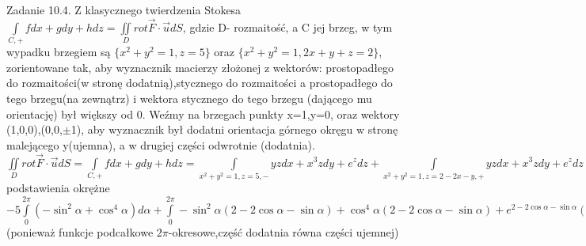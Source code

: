 \documentclass{article}
\begin{document}
Zadanie 10.4.
\newline
\newline
Z klasycznego twierdzenia Stokesa $\int\limits_{C,+}fdx+gdy+hdz=\iint\limits_{D}rot\overrightarrow{F}\cdot\overrightarrow{u}dS$, gdzie D- rozmaitość, a C jej brzeg,
w tym wypadku brzegiem są $\{x^2+y^2=1,z=5\}$ oraz $\{x^2+y^2=1,2x+y+z=2\}$, zorientowane tak, aby wyznacznik macierzy złożonej z wektorów:
prostopadłego do rozmaitości(w stronę dodatnią),stycznego do rozmaitości a prostopadłego do tego brzegu(na zewnątrz) i wektora stycznego do tego brzegu (dającego mu orientację)
był większy od 0. Weźmy na brzegach punkty x=1,y=0, oraz wektory (1,0,0),(0,0,$\pm$1), aby wyznacznik był dodatni orientacja górnego okręgu w stronę malejącego y(ujemna),
a w drugiej części odwrotnie (dodatnia).
$\iint\limits_{D}rot\overrightarrow{F}\cdot\overrightarrow{u}dS=\int\limits_{C,+}fdx+gdy+hdz=
\int\limits_{x^2+y^2=1,z=5,-}yzdx+x^3zdy+e^zdz+\int\limits_{x^2+y^2=1,z=2-2x-y,+}yzdx+x^3zdy+e^zdz
$
podstawienia okrężne
$
-5\int\limits_{0}^{2\pi}(-\sin^2{\alpha}+\cos^4{\alpha})d\alpha+
\int\limits_{0}^{2\pi}-\sin^2{\alpha}(2-2\cos{\alpha}-\sin{\alpha})+\cos^4{\alpha}(2-2\cos{\alpha}-\sin{\alpha})+e^{2-2\cos{\alpha}-\sin{\alpha}}(2\sin{\alpha}-\cos{\alpha}d\alpha)=
-5(-\pi+\frac{3}{4}\pi)+2(-\pi+\frac{3}{4}\pi)+\int\limits_{0}^{2\pi}2\sin^2{\alpha}\cos{\alpha}+\sin^3{\alpha}-2\cos^5{\alpha}-\sin{\alpha}\cos^4{\alpha}d\alpha-
\left[e^{2-2\cos{\alpha}-\sin{\alpha}}\right]_{0}^{2\pi}=
\frac{5\pi}{4}-\frac{\pi}{2}+0+0-0-0-0=\underline{\frac{3\pi}{4}}
$ (ponieważ funkcje podcałkowe $2\pi$-okresowe,część dodatnia równa części ujemnej)
\end{document}

